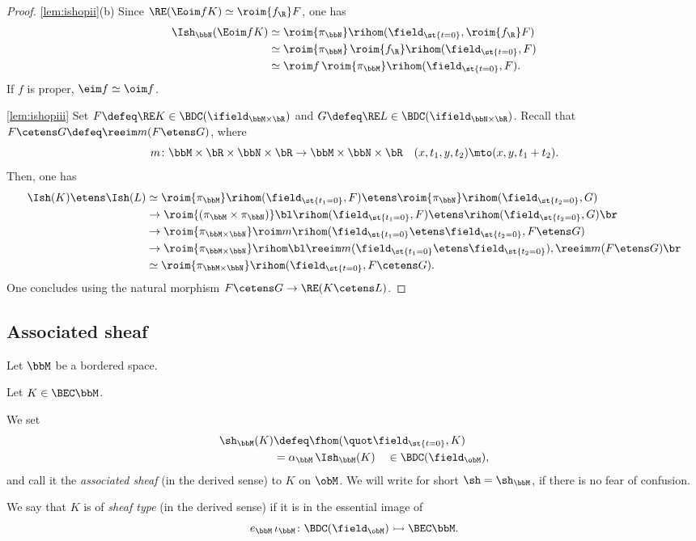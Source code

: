 \begin{proof}
\eqref{lem:ishopii}(b)
Since $\RE(\Eoim f K) \simeq \roim{{f_\R}}F$, one has
\begin{align*}
\Ish_{\bbN}(\Eoim f K)
&\simeq \roim{{\pi_\bbN}} \rihom(\field_{\st{t=0}}, \roim{{f_\R}}F) \\
&\simeq \roim{{\pi_\bbM}}\, \roim{{f_\R}}\rihom(\field_{\st{t=0}}, F) \\
&\simeq \roim f\,\roim{{\pi_\bbM}} \rihom(\field_{\st{t=0}}, F).
\end{align*}
If $f$ is proper, $\eim f\simeq\oim f$.

\eqref{lem:ishopiii}
Set $F\defeq\RE K\in\BDC(\ifield_{\bbM\times\bR})$ and $G\defeq\RE L\in\BDC(\ifield_{\bbN\times\bR})$.
Recall that $F\cetens G \defeq \reeim m(F\etens G)$, where
\[
m\colon \bbM\times\bR \times\bbN\times\bR \to \bbM\times\bbN\times\bR \quad
(x,t_1,y,t_2)\mto (x,y,t_1+t_2).
\]
Then, one has
\begin{align*}
\Ish(K){}\etens\Ish(L)
&\simeq \roim{{\pi_\bbM}}\rihom(\field_{\st{t_1=0}}, F) \etens \roim{{\pi_\bbN}}\rihom(\field_{\st{t_2=0}}, G) \\
&\to \roim{(\pi_\bbM\times\pi_\bbN)}\bl\rihom(\field_{\st{t_1=0}}, F) \etens \rihom(\field_{\st{t_2=0}}, G)\br \\
&\to \roim{{\pi_{\bbM\times\bbN}}}\roim m\rihom(\field_{\st{t_1=0}}\etens\field_{\st{t_2=0}}, F\etens G) \\
&\to \roim{{\pi_{\bbM\times\bbN}}}\rihom\bl
\reeim m(\field_{\st{t_1=0}}\etens\field_{\st{t_2=0}}), \reeim m (F\etens G)\br \\
&\simeq \roim{{\pi_{\bbM\times\bbN}}}\rihom(\field_{\st{t=0}}, F\cetens G).
\end{align*}
One concludes using the natural morphism $F\cetens G \to \RE(K\cetens L)$.
\end{proof}

\subsection{Associated sheaf}

Let $\bbM$ be a bordered space.

\begin{definition}
Let $K\in\BEC \bbM$.
\begin{enumeratei}
\item
We set
\begin{align*}
\sh_\bbM(K) &\defeq \fhom(\quot\field_{\st{t=0}},K) \\
&= \alpha_\bbM\,\Ish_\bbM(K) \quad \in \BDC(\field_\obM),
\end{align*}
and call it the \emph{associated sheaf} (in the derived sense) to $K$ on $\obM$.
We will write for short $\sh=\sh_\bbM$, if there is no fear of confusion.
\item
We say that $K$ is of \emph{sheaf type} (in the derived sense) if it is in the essential image of
\[
e_\bbM\,\iota_\bbM\colon \BDC(\field_\obM) \rightarrowtail\BEC\bbM.
\]
\end{enumeratei}
\end{definition}

